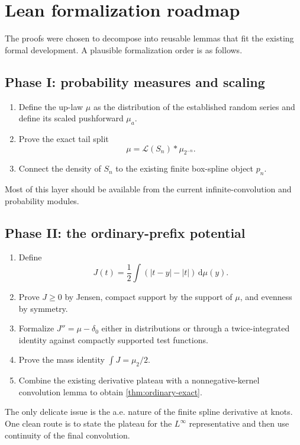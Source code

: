 \documentclass[11pt]{article}
\numberwithin{equation}{section}
\theoremstyle{definition}
\theoremstyle{remark}
\newcommand{\dd}{\,\mathrm d}
\newcommand{\abs}[1]{\left|#1\right|}
\begin{document}
\section{Lean formalization roadmap}
\label{sec:formalization}

The proofs were chosen to decompose into reusable lemmas that fit the existing formal development.  A plausible formalization order is as follows.

\subsection{Phase I: probability measures and scaling}

\begin{enumerate}
\item Define the up-law $\mu$ as the distribution of the established random series and define its scaled pushforward $\mu_a$.
\item Prove the exact tail split
\[
 \mu=\mathcal L(S_n)*\mu_{2^{-n}}.
\]
\item Connect the density of $S_n$ to the existing finite box-spline object $p_n$.
\end{enumerate}

Most of this layer should be available from the current infinite-convolution and probability modules.

\subsection{Phase II: the ordinary-prefix potential}

\begin{enumerate}
\item Define
\[
 J(t)=\frac12\int(\abs{t-y}-\abs t)\dd\mu(y).
\]
\item Prove $J\ge0$ by Jensen, compact support by the support of $\mu$, and evenness by symmetry.
\item Formalize $J''=\mu-\delta_0$ either in distributions or through a twice-integrated identity against compactly supported test functions.
\item Prove the mass identity $\int J=\mu_2/2$.
\item Combine the existing derivative plateau with a nonnegative-kernel convolution lemma to obtain \cref{thm:ordinary-exact}.
\end{enumerate}

The only delicate issue is the a.e. nature of the finite spline derivative at knots.  One clean route is to state the plateau for the $L^\infty$ representative and then use continuity of the final convolution.
\end{document}
